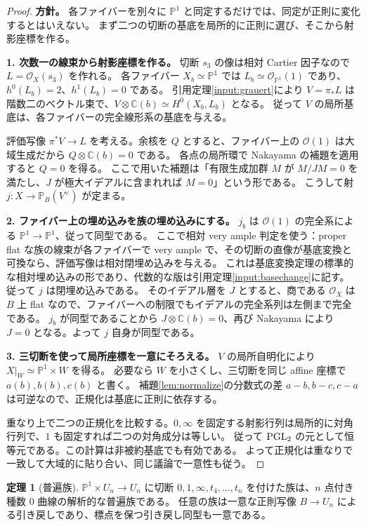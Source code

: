 \documentclass[dvipdfmx,a4paper,11pt]{article}
\theoremstyle{definition}
\newtheorem{thm}{定理}[section]
\newcommand{\C}{\mathbb C}\newcommand{\R}{\mathbb R}\newcommand{\Z}{\mathbb Z}\newcommand{\Q}{\mathbb Q}
\newcommand{\PP}{\mathbb P}\newcommand{\HH}{\mathbb H}
\newcommand{\OO}{\mathcal O}\newcommand{\MM}{\mathcal M}\newcommand{\TT}{\mathcal T}
\begin{document}
\begin{proof}
\textbf{方針。} 各ファイバーを別々に $\PP^1$ と同定するだけでは、同定が正則に変化するとはいえない。
まず二つの切断の基底を局所的に正則に選び、そこから射影座標を作る。

\textbf{1. 次数一の線束から射影座標を作る。}
切断 $s_3$ の像は相対 Cartier 因子なので $L=\OO_X(s_3)$ を作れる。
各ファイバー $X_b\simeq\PP^1$ では $L_b\simeq\OO_{\PP^1}(1)$ であり、$h^0(L_b)=2$、$h^1(L_b)=0$ である。
引用定理\ref{input:grauert}により $V=\pi_*L$ は階数二のベクトル束で、$V\otimes\C(b)\simeq H^0(X_b,L_b)$ となる。
従って $V$ の局所基底は、各ファイバーの完全線形系の基底を与える。

評価写像 $\pi^*V\to L$ を考える。余核を $Q$ とすると、ファイバー上の $\OO(1)$ は大域生成だから $Q\otimes\C(b)=0$ である。
各点の局所環で Nakayama の補題を適用すると $Q=0$ を得る。
ここで用いた補題は「有限生成加群 $M$ が $M/JM=0$ を満たし、$J$ が極大イデアルに含まれれば $M=0$」という形である。
こうして射 $j:X\to\PP_B(V^\vee)$ が定まる。

\textbf{2. ファイバー上の埋め込みを族の埋め込みにする。}
$j_b$ は $\OO(1)$ の完全系による $\PP^1\to\PP^1$、従って同型である。
ここで相対 very ample 判定を使う：proper flat な族の線束が各ファイバーで very ample で、その切断の直像が基底変換と可換なら、評価写像は相対閉埋め込みを与える。
これは基底変換定理の標準的な相対埋め込みの形であり、代数的な版は引用定理\ref{input:basechange}に記す。
従って $j$ は閉埋め込みである。
そのイデアル層を $J$ とすると、商である $\OO_X$ は $B$ 上 flat なので、ファイバーへの制限でもイデアルの完全系列は左側まで完全である。
$j_b$ が同型であることから $J\otimes\C(b)=0$、再び Nakayama により $J=0$ となる。よって $j$ 自身が同型である。

\textbf{3. 三切断を使って局所座標を一意にそろえる。}
$V$ の局所自明化により $X|_W\simeq\PP^1\times W$ を得る。
必要なら $W$ を小さくし、三切断を同じ affine 座標で $a(b),b(b),c(b)$ と書く。
補題\ref{lem:normalize}の分数式の差 $a-b,b-c,c-a$ は可逆なので、正規化は基底に正則に依存する。

重なり上で二つの正規化を比較する。$0,\infty$ を固定する射影行列は局所的に対角行列で、$1$ も固定すれば二つの対角成分は等しい。
従って $\operatorname{PGL}_2$ の元として恒等元である。この計算は非被約基底でも有効である。
よって正規化は重なりで一致して大域的に貼り合い、同じ議論で一意性も従う。
\end{proof}
\begin{thm}[普遍族]\label{thm:univg0}
$\PP^1\times U_n\to U_n$ に切断 $0,1,\infty,t_4,\ldots,t_n$ を付けた族は、$n$ 点付き種数 $0$ 曲線の解析的な普遍族である。
任意の族は一意な正則写像 $B\to U_n$ による引き戻しであり、標点を保つ引き戻し同型も一意である。
\end{thm}
\end{document}
